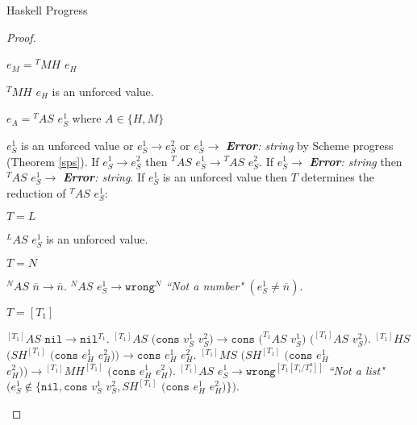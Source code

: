 \begin{theorem}{Haskell Progress}
\begin{proof}
\begin{case}
\end{case}


\begin{case}

$e_{M}={^{T}M}H$ $e_{H}$

$^{T}MH$ $e_{H}$ is an unforced value.

\end{case}


\begin{case}

$e_{A}={^{T}A}S$ $e_{S}^{1}$ where $A\in\lbrace H,M\rbrace$

$e_{S}^{1}$ is an unforced value or $e_{S}^{1}\rightarrow e_{S}^{2}$ or $e_{S}^{1}\rightarrow$ \emph{\textbf{Error}: string} by Scheme progress (Theorem \ref{sps}).  If $e_{S}^{1}\rightarrow e_{S}^{2}$ then $^{T}AS$ $e_{S}^{1}\rightarrow{^{T}A}S$ $e_{S}^{2}$.  If $e_{S}^{1}\rightarrow$ \emph{\textbf{Error}: string} then $^{T}AS$ $e_{S}^{1}\rightarrow$ \emph{\textbf{Error}: string}.  If $e_{S}^{1}$ is an unforced value then $T$ determines the reduction of $^{T}AS$ $e_{S}^{1}$:

\begin{subcase}

$T=L$

$^{L}AS$ $e_{S}^{1}$ is an unforced value.

\end{subcase}

\begin{subcase}

$T=N$

$^{N}AS$ $\overline{n}\rightarrow\overline{n}$.  $^{N}AS$ $e_{S}^{1}\rightarrow\mathtt{wrong}^{N}$ \emph{``Not a number"} $(e_{S}^{1}\neq\overline{n})$.

\end{subcase}

\begin{subcase}

$T=[T_{1}]$

$^{[T_{1}]}AS$ $\mathtt{nil}\rightarrow\mathtt{nil}^{T_{1}}$.  $^{[T_{1}]}AS$ $(\mathtt{cons}$ $v_{S}^{1}$ $v_{S}^{2})\rightarrow\mathtt{cons}$ $(^{T_{1}}AS$ $v_{S}^{1})$ $(^{[T_{1}]}AS$ $v_{S}^{2})$.  $^{[T_{1}]}HS$ $(SH^{[T_{1}]}$ $(\mathtt{cons}$ $e_{H}^{1}$ $e_{H}^{2}))\rightarrow\mathtt{cons}$ $e_{H}^{1}$ $e_{H}^{2}$.  $^{[T_{1}]}MS$ $(SH^{[T_{1}]}$ $(\mathtt{cons}$ $e_{H}^{1}$ $e_{H}^{2}))\rightarrow{^{[T_{1}]}M}H^{[T_{1}]}$ $(\mathtt{cons}$ $e_{H}^{1}$ $e_{H}^{2})$.  $^{[T_{1}]}AS$ $e_{S}^{1}\rightarrow\mathtt{wrong}^{[T_{1}[T_{i}/T_{i}^{a}]]}$ \emph{``Not a list"} $(e_{S}^{1}\not\in\lbrace\mathtt{nil},\mathtt{cons}$ $v_{S}^{1}$ $v_{S}^{2},SH^{[T_{1}]}$ $(\mathtt{cons}$ $e_{H}^{1}$ $e_{H}^{2})\rbrace)$.


\end{subcase}
\end{case}
\end{proof}
\end{theorem}
